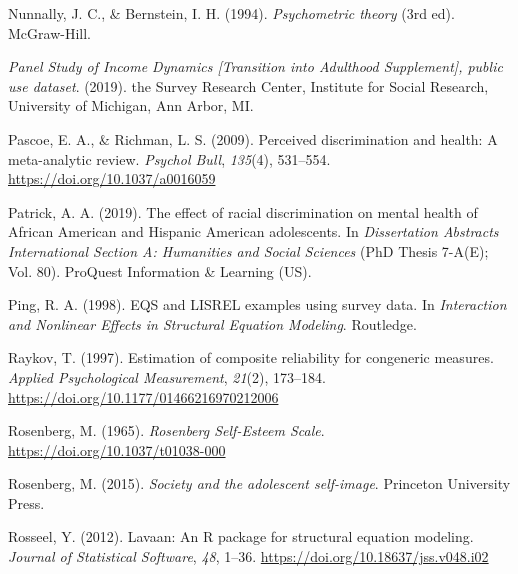 \documentclass[
  man]{apa7}
\newlength{\cslhangindent}
\newlength{\cslentryspacingunit} %
\newenvironment{CSLReferences}[2] %
 {%
  \setlength{\parindent}{0pt}
  \ifodd #1
  \let\oldpar\par
  \def\par{\hangindent=\cslhangindent\oldpar}
  \fi
  \setlength{\parskip}{#2\cslentryspacingunit}
 }%
 {}
\begin{document}
\begin{CSLReferences}{1}{0}
\leavevmode{}%
Nunnally, J. C., \& Bernstein, I. H. (1994). \emph{Psychometric theory} (3rd ed). McGraw-Hill.

\leavevmode{}%
\emph{Panel {Study} of {Income Dynamics} {[}{Transition} into {Adulthood Supplement}{]}, public use dataset}. (2019). the Survey Research Center, Institute for Social Research, University of Michigan, Ann Arbor, MI.

\leavevmode{}%
Pascoe, E. A., \& Richman, L. S. (2009). Perceived discrimination and health: {A} meta-analytic review. \emph{Psychol Bull}, \emph{135}(4), 531--554. \url{https://doi.org/10.1037/a0016059}

\leavevmode{}%
Patrick, A. A. (2019). The effect of racial discrimination on mental health of {African American} and {Hispanic American} adolescents. In \emph{Dissertation Abstracts International Section A: Humanities and Social Sciences} (PhD Thesis 7-A(E); Vol. 80). ProQuest Information \& Learning (US).

\leavevmode{}%
Ping, R. A. (1998). {EQS} and {LISREL} examples using survey data. In \emph{Interaction and {Nonlinear Effects} in {Structural Equation Modeling}}. Routledge.

\leavevmode{}%
Raykov, T. (1997). Estimation of composite reliability for congeneric measures. \emph{Applied Psychological Measurement}, \emph{21}(2), 173--184. \url{https://doi.org/10.1177/01466216970212006}

\leavevmode{}%
Rosenberg, M. (1965). \emph{Rosenberg {Self-Esteem Scale}}. \url{https://doi.org/10.1037/t01038-000}

\leavevmode{}%
Rosenberg, M. (2015). \emph{Society and the adolescent self-image}. Princeton University Press.

\leavevmode{}%
Rosseel, Y. (2012). Lavaan: {An R} package for structural equation modeling. \emph{Journal of Statistical Software}, \emph{48}, 1--36. \url{https://doi.org/10.18637/jss.v048.i02}


\end{CSLReferences}
\end{document}
